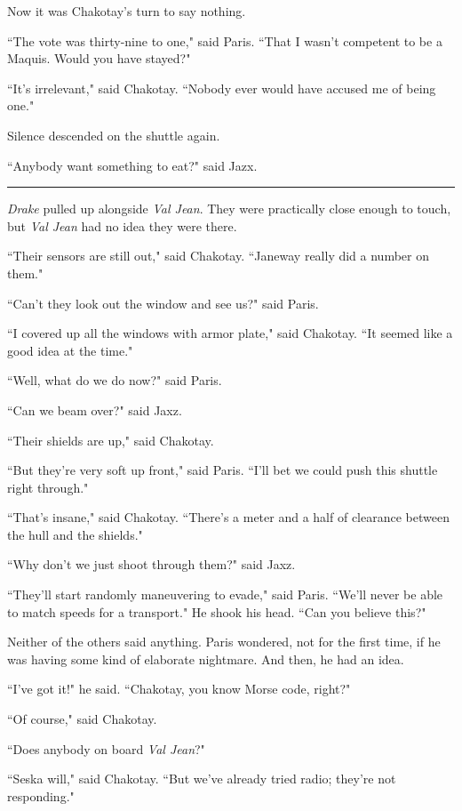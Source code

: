 \documentclass[twoside,letterpaper,12pt]{memoir}
\begin{document}
Now it was Chakotay's turn to say nothing.

``The vote was thirty-nine to one," said Paris. ``That I wasn't competent to be a Maquis. Would you have stayed?"

``It's irrelevant," said Chakotay. ``Nobody ever would have accused me of being one."

Silence descended on the shuttle again.

``Anybody want something to eat?" said Jazx.

\begin{center}\rule{3cm}{0.4 pt}\end{center}

\textit{Drake} pulled up alongside \textit{Val Jean}. They were practically close enough to touch, but \textit{Val Jean} had no idea they were there.

``Their sensors are still out," said Chakotay. ``Janeway really did a number on them."

``Can't they look out the window and see us?" said Paris.

``I covered up all the windows with armor plate," said Chakotay. ``It seemed like a good idea at the time."

``Well, what do we do now?" said Paris.

``Can we beam over?" said Jaxz.

``Their shields are up," said Chakotay.

``But they're very soft up front," said Paris. ``I'll bet we could push this shuttle right through."

``That's insane," said Chakotay. ``There's a meter and a half of clearance between the hull and the shields."

``Why don't we just shoot through them?" said Jaxz.

``They'll start randomly maneuvering to evade," said Paris. ``We'll never be able to match speeds for a transport." He shook his head. ``Can you believe this?"

Neither of the others said anything. Paris wondered, not for the first time, if he was having some kind of elaborate nightmare. And then, he had an idea.

``I've got it!" he said. ``Chakotay, you know Morse code, right?"

``Of course," said Chakotay.

``Does anybody on board \textit{Val Jean}?"

``Seska will," said Chakotay. ``But we've already tried radio; they're not responding."
\end{document}
